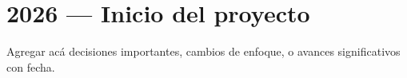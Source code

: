 \section{2026 — Inicio del proyecto}

Agregar acá decisiones importantes, cambios de enfoque, o avances significativos con fecha.
